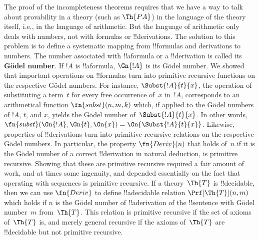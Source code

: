 The proof of the incompleteness theorems requires that we have a way
to talk about provability in a theory (such as $\Th{PA}$) in the
language of the theory itself, i.e., in the language of
arithmetic. But the language of arithmetic only deals with numbers,
not with formulas or !!{derivation}s.  The solution to this problem is
to define a systematic mapping from !!{formula}s and derivations to
numbers. The number associated with !!a{formula} or a !!{derivation}
is called its \textbf{G\"odel number}.  If $!A$ is !!a{formula},
$\Gn{!A}$ is its G\"odel number. We showed that important operations on
!!{formula}s turn into primitive
recursive functions on the respective G\"odel
numbers. For instance, $\Subst{!A}{t}{x}$, the operation of
substituting a term~$t$ for every free occurrence of~$x$ in~$!A$,
corresponds to an arithmetical function $\fn{subst}(n,m,k)$ which, if
applied to the G\"odel numbers of $!A$, $t$, and $x$, yields the
G\"odel number of~$\Subst{!A}{t}{x}$. In other words,
$\fn{subst}(\Gn{!A}, \Gn{t}, \Gn{x}) = \Gn{\Subst{!A}{t}{x}}$.
Likewise, properties of !!{derivation}s
turn into primitive recursive relations on the respective G\"odel
numbers.  In particular, the property $\fn{Deriv}(n)$ that holds
of~$n$ if it is the G\"odel number of a correct !!{derivation} in
natural deduction, is primitive recursive.  Showing that these are
primitive recursive required a fair amount of work, and at times some
ingenuity, and depended essentially on the fact that operating with
sequences is primitive recursive.  If a theory~$\Th{T}$ is
!!{decidable}, then we can use $\fn{Deriv}$ to define !!a{decidable}
relation $\Prf[\Th{T}](n, m)$ which holds if $n$ is the G\"odel number
of !!a{derivation} of the !!{sentence} with G\"odel number~$m$
from~$\Th{T}$.  This relation is primitive recursive if the set of
axioms of~$\Th{T}$ is, and merely general recursive if the axioms
of~$\Th{T}$ are !!{decidable} but not primitive recursive.
